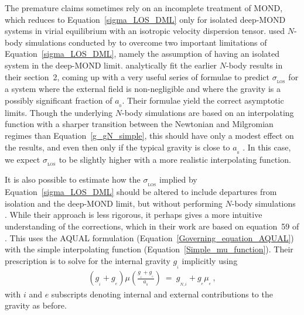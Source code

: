 \documentclass[fleqn,usenatbib,useAMS]{mnras} %
\begin{document}
The premature claims sometimes rely on an incomplete treatment of MOND, which reduces to Equation~\ref{sigma_LOS_DML} only for isolated deep-MOND systems in virial equilibrium with an isotropic velocity dispersion tensor. \citet{Haghi_2019_DF2} used $N$-body simulations conducted by \citet{Haghi_2009} to overcome two important limitations of Equation~\ref{sigma_LOS_DML}, namely the assumption of having an isolated system in the deep-MOND limit. \citet{Haghi_2019_DF2} analytically fit the earlier $N$-body results in their section~2, coming up with a very useful series of formulae to predict $\sigma_{_\text{LOS}}$ for a system where the external field is non-negligible and where the gravity is a possibly significant fraction of $a_{_0}$. Their formulae yield the correct asymptotic limits. Though the underlying $N$-body simulations are based on an interpolating function with a sharper transition between the Newtonian and Milgromian regimes than Equation~\ref{g_gN_simple}, this should have only a modest effect on the results, and even then only if the typical gravity is close to $a_{_0}$ \citep{Haghi_2009}. In this case, we expect $\sigma_{_\text{LOS}}$ to be slightly higher with a more realistic interpolating function.

It is also possible to estimate how the $\sigma_{_\text{LOS}}$ implied by Equation~\ref{sigma_LOS_DML} should be altered to include departures from isolation and the deep-MOND limit, but without performing $N$-body simulations \citep{Famaey_2018}. While their approach is less rigorous, it perhaps gives a more intuitive understanding of the corrections, which in their work are based on equation~59 of \citet{Famaey_McGaugh_2012}. This uses the AQUAL formulation (Equation~\ref{Governing_equation_AQUAL}) with the simple interpolating function (Equation~\ref{Simple_mu_function}). Their prescription is to solve for the internal gravity $g_{_i}$ implicitly using
\begin{eqnarray}
	\left( g_{_i} + g_{_e} \right) \mu \left( \frac{g_{_i} + g_{_e}}{a_{_0}} \right) ~=~ g_{_{N,i}} + g_{_e} \mu_{_e} \, ,
	\label{Famaey_ansatz}
\end{eqnarray}
with $i$ and $e$ subscripts denoting internal and external contributions to the gravity as before.
\end{document}
